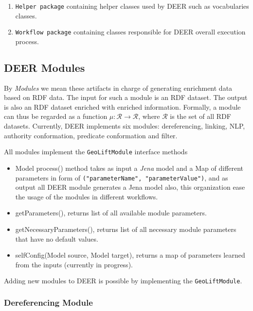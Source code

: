 \documentclass[a4paper,twoside,bibtotoc,abstracton,12pt,BCOR=15mm]{article}
\newcommand{\geolift}{\textsc{DEER}\xspace}
\begin{document}
\begin{enumerate}
  \item \texttt{Helper package} containing helper classes used by \geolift such as vocabularies classes.
  
  \item \texttt{Workflow package} containing classes responsible for \geolift overall execution process.
\end{enumerate}



\subsection{\geolift Modules}
    By \emph{Modules} we mean these artifacts in charge of generating enrichment data based on RDF data. 
    The input for such a module is an RDF dataset.
    The output is also an RDF dataset enriched with enriched information.
    Formally, a module can thus be regarded as a function $\mu: \mathcal{R} \rightarrow \mathcal{R}$, where $\mathcal{R}$ is the set of all RDF datasets.
    Currently, \geolift implements six modules: dereferencing, linking, NLP, authority conformation, predicate conformation and filter.

    All modules implement the \texttt{GeoLiftModule} interface methods 
    \begin{itemize}
      \item Model process() method takes as input a \emph{Jena} model and a Map of different parameters in form of \texttt{("parameterName", "parameterValue")},
    and as output all \geolift module generates a Jena model also, this organization ease the usage of the modules in different workflows.
      \item getParameters(), returns list of all available module parameters.
      \item getNecessaryParameters(), returns list of all necessary module parameters that have no default values.
      \item selfConfig(Model source, Model target), returns a map of parameters learned from the inputs (currently in progress).
    \end{itemize}

    Adding new modules to \geolift is possible by implementing the \texttt{GeoLiftModule}.
    \subsubsection{Dereferencing Module}
\end{document}
